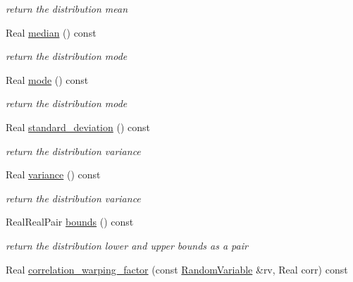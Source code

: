 \begin{DoxyCompactItemize}
\begin{DoxyCompactList}\small\item\em return the distribution mean \end{DoxyCompactList}\item 
Real \hyperlink{classPecos_1_1UniformRandomVariable_ae1fff19ce29a79d657043a598523635d}{median} () const \label{classPecos_1_1UniformRandomVariable_ae1fff19ce29a79d657043a598523635d}

\begin{DoxyCompactList}\small\item\em return the distribution mode \end{DoxyCompactList}\item 
Real \hyperlink{classPecos_1_1UniformRandomVariable_a72d3d6926edd929cb3f8e12baa655f70}{mode} () const \label{classPecos_1_1UniformRandomVariable_a72d3d6926edd929cb3f8e12baa655f70}

\begin{DoxyCompactList}\small\item\em return the distribution mode \end{DoxyCompactList}\item 
Real \hyperlink{classPecos_1_1UniformRandomVariable_a6a4ed9624d511f8a4e4f509c82cb0706}{standard\+\_\+deviation} () const \label{classPecos_1_1UniformRandomVariable_a6a4ed9624d511f8a4e4f509c82cb0706}

\begin{DoxyCompactList}\small\item\em return the distribution variance \end{DoxyCompactList}\item 
Real \hyperlink{classPecos_1_1UniformRandomVariable_a4b8b05b2a9af92dad9cc304c2925a4eb}{variance} () const \label{classPecos_1_1UniformRandomVariable_a4b8b05b2a9af92dad9cc304c2925a4eb}

\begin{DoxyCompactList}\small\item\em return the distribution variance \end{DoxyCompactList}\item 
Real\+Real\+Pair \hyperlink{classPecos_1_1UniformRandomVariable_a4bdb95a8fa5fffaa0de5102f56963cf2}{bounds} () const \label{classPecos_1_1UniformRandomVariable_a4bdb95a8fa5fffaa0de5102f56963cf2}

\begin{DoxyCompactList}\small\item\em return the distribution lower and upper bounds as a pair \end{DoxyCompactList}\item 
Real \hyperlink{classPecos_1_1UniformRandomVariable_a9ee48b3ca93459136b2e73f77873c4aa}{correlation\+\_\+warping\+\_\+factor} (const \hyperlink{classPecos_1_1RandomVariable}{Random\+Variable} \&rv, Real corr) const \label{classPecos_1_1UniformRandomVariable_a9ee48b3ca93459136b2e73f77873c4aa}


\end{DoxyCompactItemize}
